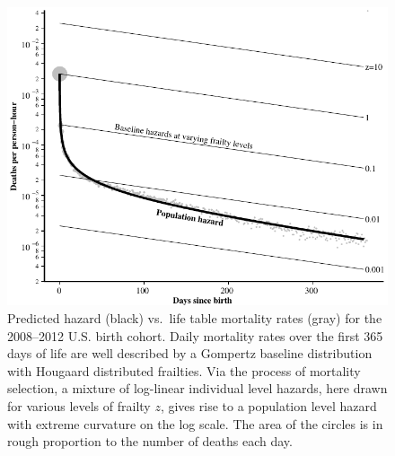 \documentclass[10pt,twoside,reqno]{article}
\makeatletter
\def\cnstmaxfigwidth{
      \ifdim \Gin@nat@width>\linewidth
        \linewidth
      \else \Gin@nat@width
      \fi
    }
\let\Oldincludegraphics\includegraphics
\renewcommand{\includegraphics}[1]{\Oldincludegraphics[width=\cnstmaxfigwidth]{#1}}
\makeatother
\begin{document}
\begin{figure}
\centering
\includegraphics{fig/hougaard_gompertz_fit.pdf}
\caption{\label{fig:hougaard-gompertz-fit}Predicted hazard (black) vs.~life table mortality rates (gray) for the 2008--2012 U.S. birth cohort. Daily mortality rates over the first 365 days of life are well described by a Gompertz baseline distribution with Hougaard distributed frailties. Via the process of mortality selection, a mixture of log-linear individual level hazards, here drawn for various levels of frailty \(z\), gives rise to a population level hazard with extreme curvature on the log scale. The area of the circles is in rough proportion to the number of deaths each day.}
\end{figure}
\end{document}
